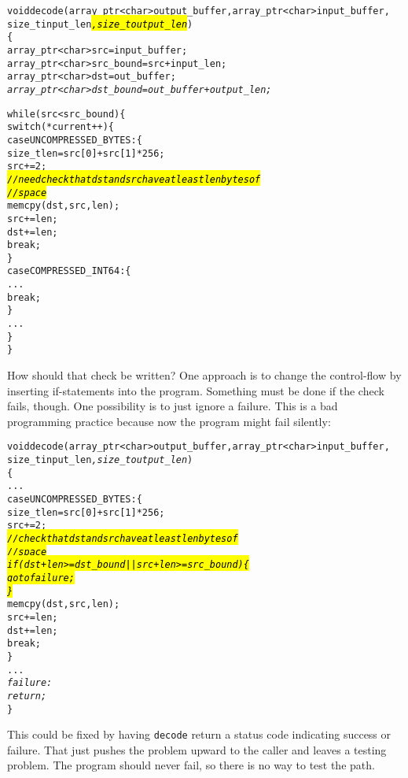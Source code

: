\begin{alltt}
void decode(array\_ptr<char> output\_buffer, array\_ptr<char> input\_buffer, 
            size\_t input_len\hl{\textit{, size\_t output_len}})
\{
    array\_ptr<char> src = input\_buffer;
    array\_ptr<char> src\_bound = src + input\_len;
    array\_ptr<char> dst = out\_buffer;
    \textit{array\_ptr<char> dst\_bound = out\_buffer + output\_len;}


    while (src < src\_bound) \{
        switch (*current++) \{
            case UNCOMPRESSED\_BYTES: \{ 
                size\_t len = src[0] + src[1]*256;
                src += 2;
                \hl{\textit{// need check that dst and src have at least len bytes of}}
                \hl{\textit{// space}}
                memcpy(dst, src, len);
                src += len;
                dst += len;                
                break;
            \}
            case COMPRESSED\_INT64: \{
                ...
                break;
            \}
        ...
    \}
\}
\end{alltt}

How should that check be written? One approach is to change the
control-flow by inserting if-statements into the program. Something must
be done if the check fails, though. One possibility is to just ignore a
failure. This is a bad programming practice because now the program might
fail silently:

\begin{alltt}
void decode(array\_ptr<char> output\_buffer, array\_ptr<char> input\_buffer, 
            size\_t input\_len\textit{, size\_t output\_len})
\{
      ...
            case UNCOMPRESSED\_BYTES: \{
                size\_t len = src[0] + src[1]*256;
                src += 2;
                \hl{\textit{// check that dst and src have at least len bytes of}}
                \hl{\textit{// space}}
                \hl{\textit{if (dst + len >= dst\_bound || src + len >= src\_bound) \{}}
                \hl{\textit{   goto failure;}}
                \hl{\textit{\}}}
                memcpy(dst, src, len);
                src += len;
                dst += len;                
                break;
            \}
   ...
   \textit{failure:}
   \textit{   return;}
\}
\end{alltt}

This could be fixed by having \texttt{decode} return a status code
indicating success or failure. That just pushes the problem upward to
the caller and leaves a testing problem. The program should never fail,
so there is no way to test the path.

